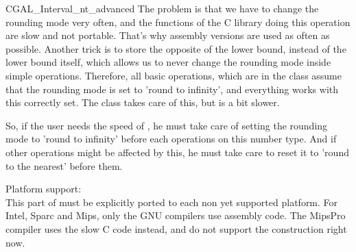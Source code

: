 \begin{ccAdvanced}
\begin{ccClass} {CGAL_Interval_nt_advanced}
The problem is that we have to change the rounding mode very often, and the
functions of the C library doing this operation are slow and not portable.
That's why assembly versions are used as often as possible.
Another trick is to store the opposite of the lower bound, instead of the
lower bound itself, which allows us to never change the rounding mode inside
simple operations.  Therefore, all basic operations, which are in the class 
 assume that the rounding mode is set to 
'round to infinity', and everything works with this correctly set.  
The class  takes care of this, but is a bit slower.

So, if the user needs the speed of , he must
take care of setting the rounding mode to 'round to infinity' before each
operations on this number type.  And if other operations might be affected by
this, he must take care to reset it to 'round to the nearest' before them.


Platform support:\\
This part of {\cgal} must be explicitly ported to each non yet supported
platform.  For Intel, Sparc and Mips, only the GNU compilers use assembly
code.  The MipsPro compiler uses the slow C code instead, and do not
support the construction  right now.


\end{ccClass}
\end{ccAdvanced}
